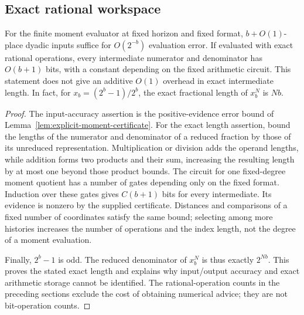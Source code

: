 \subsection{Exact rational workspace}
\begin{lemma}
\label{lem:rational-workspace}
For the finite moment evaluator at fixed horizon and fixed format,
$b+O(1)$-place dyadic inputs suffice for $O(2^{-b})$ evaluation error.
If evaluated with exact rational operations, every intermediate numerator
and denominator has $O(b+1)$ bits, with a constant depending on the fixed
arithmetic circuit. This statement does not give an additive $O(1)$
overhead in exact intermediate length. In fact, for
$x_b=(2^b-1)/2^b$, the exact fractional length of $x_b^N$ is $Nb$.
\end{lemma}
\begin{proof}
The input-accuracy assertion is the positive-evidence error bound of
Lemma~\ref{lem:explicit-moment-certificate}. For the exact length
assertion, bound the lengths of the numerator and denominator of a
reduced fraction by those of its unreduced representation. Multiplication
or division adds the operand lengths, while addition forms two products
and their sum, increasing the resulting length by at most one beyond
those product bounds. The circuit for one fixed-degree moment quotient
has a number of gates depending only on the fixed format. Induction over
these gates gives $C(b+1)$ bits for every intermediate. Its evidence is
nonzero by the supplied certificate. Distances and comparisons of a
fixed number of coordinates satisfy the same bound; selecting among
more histories increases the number of operations and the index length,
not the degree of a moment evaluation.

Finally, $2^b-1$ is odd. The reduced denominator of $x_b^N$ is thus
exactly $2^{Nb}$. This proves the stated exact length and explains why
input/output accuracy and exact arithmetic storage cannot be identified.
The rational-operation counts in the preceding sections exclude the
cost of obtaining numerical advice; they are not bit-operation counts.
\end{proof}
